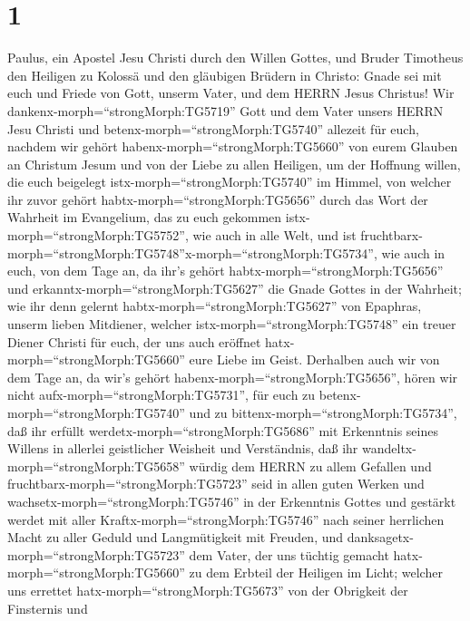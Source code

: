 \hypertarget{section}{%
\section{1}\label{section}}

 Paulus, ein Apostel Jesu Christi durch den Willen Gottes,
und Bruder Timotheus  den Heiligen zu Kolossä und den
gläubigen Brüdern in Christo: Gnade sei mit euch und Friede von Gott,
unserm Vater, und dem HERRN Jesus Christus!  Wir
dankenx-morph=``strongMorph:TG5719'' Gott und dem Vater unsers HERRN
Jesu Christi und betenx-morph=``strongMorph:TG5740'' allezeit für euch,
 nachdem wir gehört habenx-morph=``strongMorph:TG5660'' von
eurem Glauben an Christum Jesum und von der Liebe zu allen Heiligen,
 um der Hoffnung willen, die euch beigelegt
istx-morph=``strongMorph:TG5740'' im Himmel, von welcher ihr zuvor
gehört habtx-morph=``strongMorph:TG5656'' durch das Wort der Wahrheit im
Evangelium,  das zu euch gekommen
istx-morph=``strongMorph:TG5752'', wie auch in alle Welt, und ist
fruchtbarx-morph=``strongMorph:TG5748''x-morph=``strongMorph:TG5734'',
wie auch in euch, von dem Tage an, da ihr's gehört
habtx-morph=``strongMorph:TG5656'' und
erkanntx-morph=``strongMorph:TG5627'' die Gnade Gottes in der Wahrheit;
 wie ihr denn gelernt habtx-morph=``strongMorph:TG5627'' von
Epaphras, unserm lieben Mitdiener, welcher
istx-morph=``strongMorph:TG5748'' ein treuer Diener Christi für euch,
 der uns auch eröffnet hatx-morph=``strongMorph:TG5660''
eure Liebe im Geist.  Derhalben auch wir von dem Tage an, da
wir's gehört habenx-morph=``strongMorph:TG5656'', hören wir nicht
aufx-morph=``strongMorph:TG5731'', für euch zu
betenx-morph=``strongMorph:TG5740'' und zu
bittenx-morph=``strongMorph:TG5734'', daß ihr erfüllt
werdetx-morph=``strongMorph:TG5686'' mit Erkenntnis seines Willens in
allerlei geistlicher Weisheit und Verständnis,  daß ihr
wandeltx-morph=``strongMorph:TG5658'' würdig dem HERRN zu allem Gefallen
und fruchtbarx-morph=``strongMorph:TG5723'' seid in allen guten Werken
 und wachsetx-morph=``strongMorph:TG5746'' in der
Erkenntnis Gottes und gestärkt werdet mit aller
Kraftx-morph=``strongMorph:TG5746'' nach seiner herrlichen Macht zu
aller Geduld und Langmütigkeit mit Freuden,  und
danksagetx-morph=``strongMorph:TG5723'' dem Vater, der uns tüchtig
gemacht hatx-morph=``strongMorph:TG5660'' zu dem Erbteil der Heiligen im
Licht;  welcher uns errettet
hatx-morph=``strongMorph:TG5673'' von der Obrigkeit der Finsternis und
